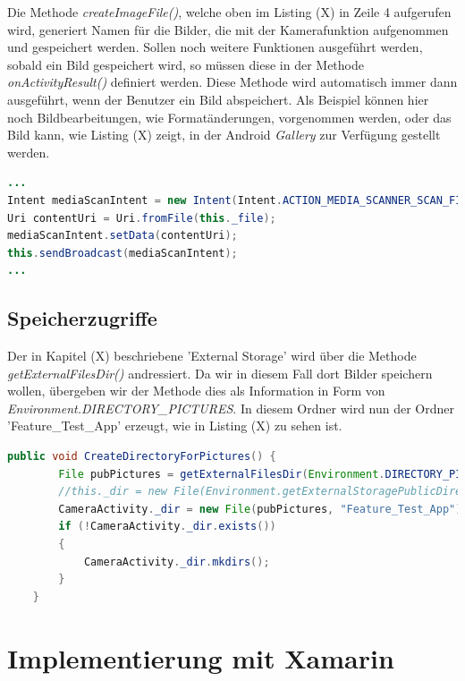 Die Methode \textit{createImageFile()}, welche oben im Listing (X) in Zeile 4 aufgerufen wird, generiert Namen für die Bilder, die mit der Kamerafunktion aufgenommen und gespeichert werden. Sollen noch weitere Funktionen ausgeführt werden, sobald ein Bild gespeichert wird, so müssen diese in der Methode \textit{onActivityResult()} definiert werden. Diese Methode wird automatisch immer dann ausgeführt, wenn der Benutzer ein Bild abspeichert. Als Beispiel können hier noch Bildbearbeitungen, wie Formatänderungen, vorgenommen werden, oder das Bild kann, wie Listing (X) zeigt, in der Android \textit{Gallery} zur Verfügung gestellt werden.

\begin{lstlisting}[caption=Bereitstellen des gespeicherten Bildes für die Android \textit{Gallery}, label=lst:AndroidGallery, language=Java]
...
Intent mediaScanIntent = new Intent(Intent.ACTION_MEDIA_SCANNER_SCAN_FILE);
Uri contentUri = Uri.fromFile(this._file);
mediaScanIntent.setData(contentUri);
this.sendBroadcast(mediaScanIntent);
...
\end{lstlisting}  

\subsection{Speicherzugriffe}

Der in Kapitel (X) beschriebene 'External Storage' wird über die Methode \textit{getExternalFilesDir()} andressiert. Da wir in diesem Fall dort Bilder speichern wollen, übergeben wir der Methode dies als Information in Form von \textit{Environment.DIRECTORY\_PICTURES}. In diesem Ordner wird nun der Ordner 'Feature\_Test\_App' erzeugt, wie in Listing (X) zu sehen ist.
\clearpage

\begin{lstlisting}[caption=Adressieren des 'External Storage' und Anlegen eines Ordners für die Fotos der Funktionstest-Anwendung, label=lst:SpeicherZugriff, language=Java]
public void CreateDirectoryForPictures() {
        File pubPictures = getExternalFilesDir(Environment.DIRECTORY_PICTURES);
        //this._dir = new File(Environment.getExternalStoragePublicDirectory(Environment.DIRECTORY_PICTURES), "FeatureTestApp");
        CameraActivity._dir = new File(pubPictures, "Feature_Test_App");
        if (!CameraActivity._dir.exists())
        {
            CameraActivity._dir.mkdirs();
        }
    }
\end{lstlisting}

\section{Implementierung mit Xamarin}

